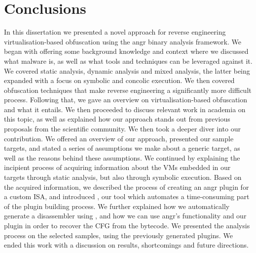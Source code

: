 \chapter{Conclusions}

In this dissertation we presented a novel approach for reverse engineering virtualisation-based obfuscation using the angr binary analysis framework. We began with offering some background knowledge and context where we discussed what malware is, as well as what tools and techniques can be leveraged against it. We covered static analysis, dynamic analysis and mixed analysis, the latter being expanded with a focus on symbolic and concolic execution. We then covered obfuscation techniques that make reverse engineering a significantly more difficult process. Following that, we gave an overview on virtualisation-based obfuscation and what it entails. We then proceeded to discuss relevant work in academia on this topic, as well as explained how our approach stands out from previous proposals from the scientific community. We then took a deeper diver into our contribution. We offered an overview of our approach, presented our sample targets, and stated a series of assumptions we make about a generic target, as well as the reasons behind these assumptions. We continued by explaining the incipient process of acquiring information about the \glspl{VM} embedded in our targets through static analysis, but also through symbolic execution. Based on the acquired information, we described the process of creating an angr plugin for a custom \gls{ISA}, and introduced , our tool which automates a time-consuming part of the plugin building process. We further explained how we automatically generate a disassembler using , and how we can use angr's functionality and our plugin in order to recover the \gls{CFG} from the bytecode. We presented the analysis process on the selected samples, using the previously generated plugins. We ended this work with a discussion on results, shortcomings and future directions.
